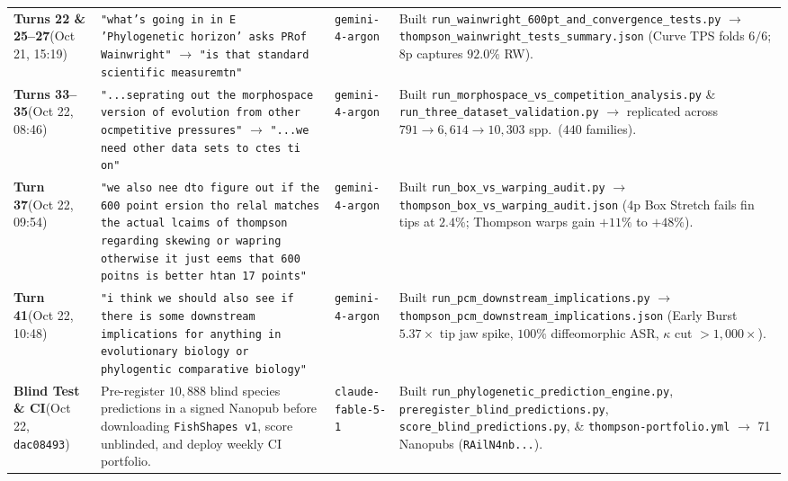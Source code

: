 \documentclass[10.5pt,a4paper]{article}
\newcommand{\code}[1]{{\footnotesize\nolinkurl{#1}}}
\begin{document}
{\begin{tabularx}{\textwidth}{L{1.15in} L{2.05in} L{0.85in} Y}
\textbf{Turns 22 \& 25--27}\newline (Oct 21, 15:19) & \texttt{"what's going in in E 'Phylogenetic horizon' asks PRof Wainwright"} $\to$ \texttt{"is that standard scientific measuremtn"} & \code{gemini-4-argon} & Built \code{run_wainwright_600pt_and_convergence_tests.py} $\to$ \code{thompson_wainwright_tests_summary.json} (Curve TPS folds $6/6$; 8p captures $92.0\%$ RW). \\
\textbf{Turns 33--35}\newline (Oct 22, 08:46) & \texttt{"...seprating out the morphospace version of evolution from other ocmpetitive pressures"} $\to$ \texttt{"...we need other data sets to ctes ti on"} & \code{gemini-4-argon} & Built \code{run_morphospace_vs_competition_analysis.py} \& \code{run_three_dataset_validation.py} $\to$ replicated across $791 \to 6{,}614 \to 10{,}303$ spp.\ ($440$ families). \\
\textbf{Turn 37}\newline (Oct 22, 09:54) & \texttt{"we also nee dto figure out if the 600 point ersion tho relal matches the actual lcaims of thompson regarding skewing or wapring otherwise it just eems that 600 poitns is better htan 17 points"} & \code{gemini-4-argon} & Built \code{run_box_vs_warping_audit.py} $\to$ \code{thompson_box_vs_warping_audit.json} (4p Box Stretch fails fin tips at $2.4\%$; Thompson warps gain $+11\%$ to $+48\%$). \\
\textbf{Turn 41}\newline (Oct 22, 10:48) & \texttt{"i think we should also see if there is some downstream implications for anything in evolutionary biology or phylogentic comparative biology"} & \code{gemini-4-argon} & Built \code{run_pcm_downstream_implications.py} $\to$ \code{thompson_pcm_downstream_implications.json} (Early Burst $5.37\times$ tip jaw spike, $100\%$ diffeomorphic ASR, $\kappa$ cut $>1{,}000\times$). \\
\textbf{Blind Test \& CI}\newline (Oct 22, \texttt{dac08493}) & Pre-register $10{,}888$ blind species predictions in a signed Nanopub before downloading \code{FishShapes v1}, score unblinded, and deploy weekly CI portfolio. & \code{claude-fable-5-1} & Built \code{run_phylogenetic_prediction_engine.py}, \code{preregister_blind_predictions.py}, \code{score_blind_predictions.py}, \& \code{thompson-portfolio.yml} $\to$ 71 Nanopubs (\code{RAilN4nb...}). \\
\bottomrule
\end{tabularx}
}
\end{document}
